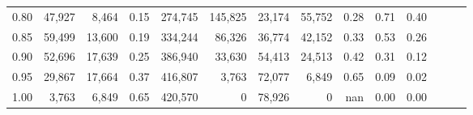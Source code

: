 \begin{tabular}{rrrrrrrrrrrrrr}
0.80 &  47,927 &   8,464 &  0.15 &  274,745 &  145,825 &  23,174 &  55,752 &  0.28 &  0.71 &      0.40 \\
0.85 &  59,499 &  13,600 &  0.19 &  334,244 &   86,326 &  36,774 &  42,152 &  0.33 &  0.53 &      0.26 \\
0.90 &  52,696 &  17,639 &  0.25 &  386,940 &   33,630 &  54,413 &  24,513 &  0.42 &  0.31 &      0.12 \\
0.95 &  29,867 &  17,664 &  0.37 &  416,807 &    3,763 &  72,077 &   6,849 &  0.65 &  0.09 &      0.02 \\
1.00 &   3,763 &   6,849 &  0.65 &  420,570 &        0 &  78,926 &       0 &   nan &  0.00 &      0.00 \\
\bottomrule
\end{tabular}
